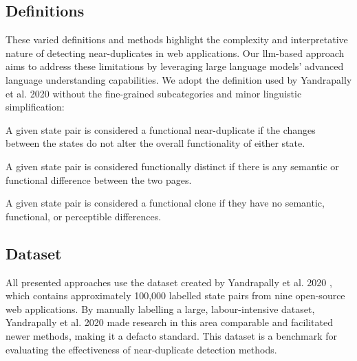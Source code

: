     \subsection{Definitions}
    
        These varied definitions and methods highlight the complexity and interpretative nature of detecting near-duplicates in web applications. Our \ac{llm}-based approach aims to address these limitations by leveraging large language models' advanced language understanding capabilities. We adopt the definition used by Yandrapally et al. 2020 \cite{yandrapally_near-duplicate_2020} without the fine-grained subcategories and minor linguistic simplification:
        
        \begin{definition}
        A given state pair is considered a functional near-duplicate if the changes between the states do not alter the overall functionality of either state.
        \end{definition}
        
        \begin{definition}[Distinct]
        A given state pair is considered functionally distinct if there is any semantic or functional difference between the two pages.
        \end{definition}
        
        \begin{definition}[Clone]
        A given state pair is considered a functional clone if they have no semantic, functional, or perceptible differences.
        \end{definition}
        
        

    \subsection{Dataset}
    
        All presented approaches use the dataset created by Yandrapally et al. 2020 \cite{yandrapally_near-duplicate_2020}, which contains approximately 100,000 labelled state pairs from nine open-source web applications. By manually labelling a large, labour-intensive dataset, Yandrapally et al. 2020 \cite{yandrapally_near-duplicate_2020} made research in this area comparable and facilitated newer methods, making it a defacto standard. This dataset is a benchmark for evaluating the effectiveness of near-duplicate detection methods. 